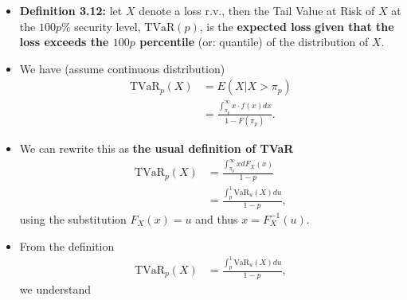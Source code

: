 \documentclass[]{book}
\theoremstyle{definition}
\theoremstyle{definition}
\theoremstyle{definition}
\theoremstyle{remark}
\begin{document}
\begin{itemize}
\item
  \textbf{Definition 3.12:} let \(X\) denote a loss r.v., then the Tail
  Value at Risk of \(X\) at the \(100p\%\) security level,
  \(\text{TVaR}(p)\), is the \textbf{expected loss} \textbf{given that
  the loss exceeds the \(100p\) percentile} (or: quantile) of the
  distribution of \(X\).
\item
  We have (assume continuous distribution) \[\begin{aligned}
  \text{TVaR}_p(X) &= E(X|X>\pi_p) \\
  &= \frac{\int_{\pi_p}^{\infty} x\cdot f(x) dx}{1-F(\pi_p)}.\end{aligned}\]
\item
  We can rewrite this as \textbf{the usual definition of TVaR}
  \[\begin{aligned}
  \text{TVaR}_p(X) &= \frac{\int_{\pi_p}^{\infty} x dF_X(x)}{1-p} \\
  &= \frac{\int_p^1 \text{VaR}_u(X) du}{1-p},\end{aligned}\] using the
  substitution \(F_X(x) = u\) and thus \(x=F_X^{-1}(u)\).
\item
  From the definition \[\begin{aligned}
  \text{TVaR}_p(X) &= \frac{\int_p^1 \text{VaR}_u(X) du}{1-p},\end{aligned}\]
  we understand


\end{itemize}
\end{document}

